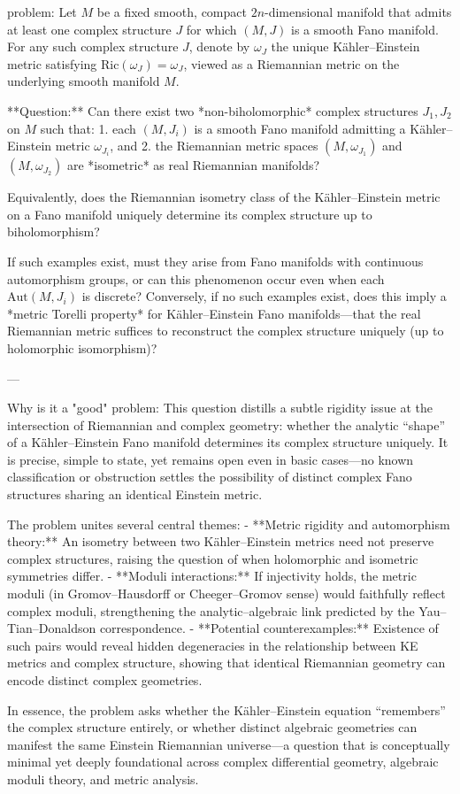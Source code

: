 problem:  
Let \(M\) be a fixed smooth, compact \(2n\)-dimensional manifold that admits at least one complex structure \(J\) for which \((M,J)\) is a smooth Fano manifold.  
For any such complex structure \(J\), denote by \(\omega_J\) the unique Kähler–Einstein metric satisfying \(\mathrm{Ric}(\omega_J)=\omega_J\), viewed as a Riemannian metric on the underlying smooth manifold \(M\).

**Question:**  
Can there exist two *non-biholomorphic* complex structures \(J_1, J_2\) on \(M\) such that:
1. each \((M,J_i)\) is a smooth Fano manifold admitting a Kähler–Einstein metric \(\omega_{J_i}\), and  
2. the Riemannian metric spaces \((M,\omega_{J_1})\) and \((M,\omega_{J_2})\) are *isometric* as real Riemannian manifolds?  

Equivalently, does the Riemannian isometry class of the Kähler–Einstein metric on a Fano manifold uniquely determine its complex structure up to biholomorphism?

If such examples exist, must they arise from Fano manifolds with continuous automorphism groups, or can this phenomenon occur even when each \(\mathrm{Aut}(M,J_i)\) is discrete?  
Conversely, if no such examples exist, does this imply a *metric Torelli property* for Kähler–Einstein Fano manifolds—that the real Riemannian metric suffices to reconstruct the complex structure uniquely (up to holomorphic isomorphism)?

---

Why is it a "good" problem:  
This question distills a subtle rigidity issue at the intersection of Riemannian and complex geometry: whether the analytic “shape” of a Kähler–Einstein Fano manifold determines its complex structure uniquely. It is precise, simple to state, yet remains open even in basic cases—no known classification or obstruction settles the possibility of distinct complex Fano structures sharing an identical Einstein metric.

The problem unites several central themes:
- **Metric rigidity and automorphism theory:** An isometry between two Kähler–Einstein metrics need not preserve complex structures, raising the question of when holomorphic and isometric symmetries differ.
- **Moduli interactions:** If injectivity holds, the metric moduli (in Gromov–Hausdorff or Cheeger–Gromov sense) would faithfully reflect complex moduli, strengthening the analytic–algebraic link predicted by the Yau–Tian–Donaldson correspondence.
- **Potential counterexamples:** Existence of such pairs would reveal hidden degeneracies in the relationship between KE metrics and complex structure, showing that identical Riemannian geometry can encode distinct complex geometries.

In essence, the problem asks whether the Kähler–Einstein equation “remembers” the complex structure entirely, or whether distinct algebraic geometries can manifest the same Einstein Riemannian universe—a question that is conceptually minimal yet deeply foundational across complex differential geometry, algebraic moduli theory, and metric analysis.